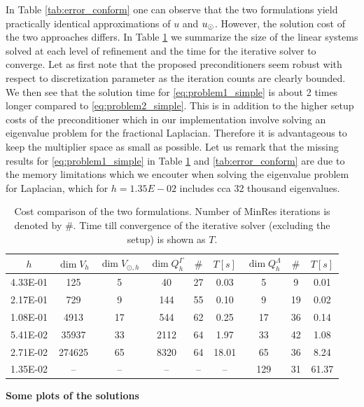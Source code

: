 \documentclass[r]{siamart171218}
\begin{document}
In Table \ref{tab:error_conform} one can observe that the two formulations
yield practically identical approximations of $u$ and $u_{\odot}$. However, the solution
cost of the two approaches differs. In Table \ref{tab:cost} we summarize the
size of the linear systems solved at each level of refinement and the time
for the iterative solver to converge. Let as first note that the proposed
preconditioners seem robust with respect to discretization parameter as
the iteration counts are clearly bounded. We then see that the solution
time for \eqref{eq:problem1_simple} is about 2 times longer compared to
\eqref{eq:problem2_simple}. This is in addition to the higher setup costs
of the preconditioner which in our implementation involve solving an eigenvalue
problem for the fractional Laplacian. Therefore it is advantageous to keep
the multiplier space as small as possible. Let us remark that the missing
results for \eqref{eq:problem1_simple} in Table \ref{tab:cost} and \ref{tab:error_conform}
are due to the memory limitations which we encouter when solving the eigenvalue problem
for Laplacian, which for $h=1.35E-02$ includes cca 32 thousand eigenvalues.
%
\begin{table}
  \scriptsize{
  \begin{center}
    \begin{tabular}{c|cc|ccc|ccc}
      \hline
      $h$ & $\dim{V_h}$ & $\dim{V_{\odot, h}}$ & $\dim{Q^{\Gamma}_h}$ & $\#$ & $T\left[s\right]$ & $\dim{Q^{\Lambda}_h}$ & $\#$ & $T\left[s\right]$\\
      \hline
4.33E-01 &125    &5  &40    &27 &0.03  &5  &9  &0.01\\
2.17E-01 &729    &9  &144   &55 &0.10  &9  &19 &0.02\\
1.08E-01 &4913   &17 &544   &62 &0.25  &17 &36 &0.14\\
5.41E-02 &35937  &33 &2112  &64 &1.97  &33 &42 &1.08\\
2.71E-02 &274625 &65 &8320  &64 &18.01 &65 &36 &8.24\\
1.35E-02 &--     &-- &--    &-- &--    &129 &31 &61.37\\
\hline
    \end{tabular}
    \end{center}
    }
  \caption{Cost comparison of the two formulations. Number of MinRes iterations
    is denoted by $\#$. Time till convergence of the iterative solver (excluding the setup) is shown
    as $T$.
  }
\label{tab:cost}
\end{table}

\textbf{Some plots of the solutions}
\end{document}

